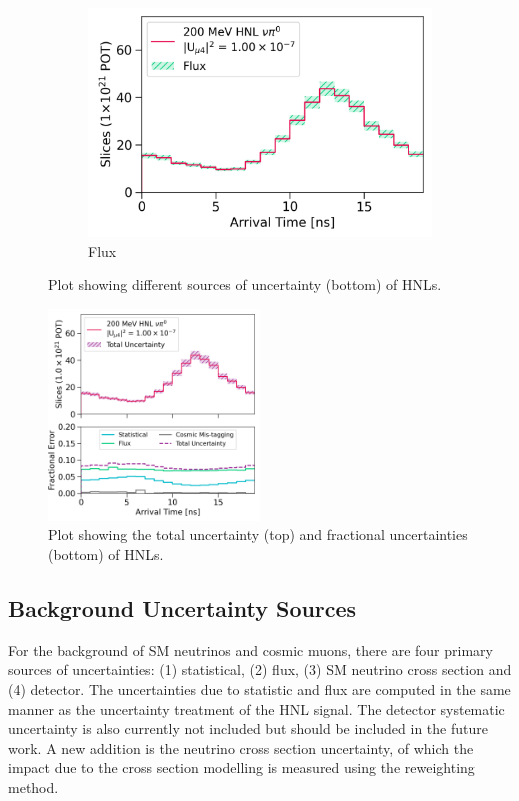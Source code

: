 \begin{figure}[htbp!]
\begin{subfigure}[b]{0.495\textwidth}
            \includegraphics[width=\textwidth]{hnl_flux_error}
            \caption{Flux}%
            \label{fig:hnl_flux}
        \end{subfigure}
        \caption{
	Plot showing different sources of uncertainty (bottom) of HNLs.
	}
        \label{fig:hnl_error}
	\vspace{0.5cm}
\centering    
\includegraphics[width=0.5\textwidth]{hnl_error}
\caption[hnl_error]{
Plot showing the total uncertainty (top) and fractional uncertainties (bottom) of HNLs.
}
\label{fig:hnl_total_error}
\end{figure}

\subsection{Background Uncertainty Sources}

For the background of SM neutrinos and cosmic muons, there are four primary sources of uncertainties: (1) statistical, (2) flux, (3) SM neutrino cross section and (4) detector.
The uncertainties due to statistic and flux are computed in the same manner as the uncertainty treatment of the HNL signal.
The detector systematic uncertainty is also currently not included but should be included in the future work.
A new addition is the neutrino cross section uncertainty, of which the impact due to the cross section modelling is measured using the reweighting method.

